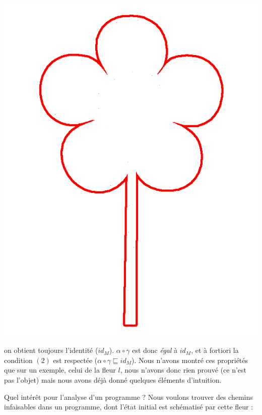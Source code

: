 \documentclass[french]{article}
\begin{document}
  \begin{center}
    \includegraphics[scale=0.19]{pictures/flower4.png}
  \end{center}
  
  on obtient toujours l'identité ($id_M$). $\alpha \circ \gamma$ est donc \textit{égal} à $id_M$, et à fortiori la condition $(2)$ est respectée ($\alpha \circ \gamma \sqsubseteq id_M$). Nous n'avons montré ces propriétés que sur un exemple, celui de la fleur $l$, nous n'avons donc rien prouvé (ce n'est pas l'objet) mais nous avons déjà donné quelques éléments d'intuition.
  
  Quel intérêt pour l'analyse d'un programme ? Nous voulons trouver des chemins infaisables dans un programme, dont l'état initial est schématisé par cette fleur :
  
\end{document}
